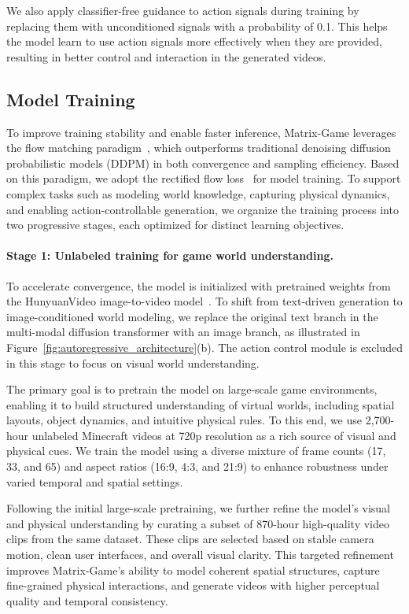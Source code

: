 \documentclass{article}
\begin{document}
We also apply classifier-free guidance to action signals during training by replacing them with unconditioned signals with a probability of 0.1. This helps the model learn to use action signals more effectively when they are provided, resulting in better control and interaction in the generated videos.
 

 

\subsection{Model Training}
To improve training stability and enable faster inference, Matrix-Game leverages the flow matching paradigm~\cite{esser2024scaling}, which outperforms traditional denoising diffusion probabilistic models (DDPM)\cite{ho2020denoising} in both convergence and sampling efficiency. Based on this paradigm, we adopt the rectified flow loss~\cite{liu2023flow} for model training. To support complex tasks such as modeling world knowledge, capturing physical dynamics, and enabling action-controllable generation, we organize the training process into two progressive stages, each optimized for distinct learning objectives.
 
 

\paragraph{Stage 1: Unlabeled training for game world understanding.} 
To accelerate convergence, the model is initialized with pretrained weights from the HunyuanVideo image-to-video model~\cite{kong2024hunyuanvideo}.
To shift from text-driven generation to image-conditioned world modeling, we replace the original text branch in the multi-modal diffusion transformer with an image branch, as illustrated in Figure~\ref{fig:autoregressive_architecture}(b). The action control module is excluded in this stage to focus on visual world understanding.

The primary goal is to pretrain the model on large-scale game environments, enabling it to build structured understanding of virtual worlds, including spatial layouts, object dynamics, and intuitive physical rules. To this end, we use 2,700-hour unlabeled Minecraft videos at 720p resolution as a rich source of visual and physical cues. We train the model using a diverse mixture of frame counts (17, 33, and 65) and aspect ratios (16:9, 4:3, and 21:9) to enhance robustness under varied temporal and spatial settings.

Following the initial large-scale pretraining, we further refine the model’s visual and physical understanding by curating a subset of 870-hour high-quality video clips from the same dataset. These clips are selected based on stable camera motion, clean user interfaces, and overall visual clarity. This targeted refinement improves Matrix-Game’s ability to model coherent spatial structures, capture fine-grained physical interactions, and generate videos with higher perceptual quality and temporal consistency.
\end{document}
